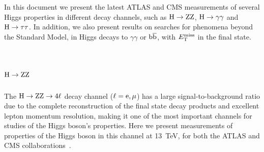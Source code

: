 \documentclass[10pt]{article}
\begin{document}
In this document we present the latest ATLAS and CMS measurements of several
Higgs properties in different decay channels, such as ${\rm H\to ZZ}$,
${\rm H\to\gamma\gamma}$ and ${\rm H\to\tau\tau}$. In addition, we also present
results on searches for phenomena beyond the Standard Model, in Higgs decays
to $\gamma\gamma$ or ${\rm b\bar{b}}$, with $E_{\rm T}^{\rm miss}$ in the final
state.


\section{\boldmath ${\rm H}\to{\rm ZZ}$}

The ${\rm H\to ZZ\to 4\ell}$ decay channel (${\rm \ell = e,\mu}$) has a large
signal-to-background ratio due to the complete reconstruction of the final state
decay products and excellent lepton momentum resolution, making it one of the
most important channels for studies of the Higgs boson's properties. Here we
present measurements of properties of the Higgs boson in this channel at 13~TeV,
for both the ATLAS and CMS collaborations~\cite{ATLAS-ZZ,CMS:2017jkd}.
\end{document}

